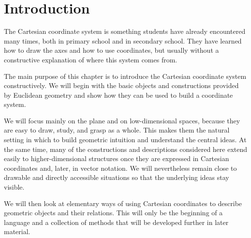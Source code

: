 \section{Introduction}

The Cartesian coordinate system is something students have already encountered many times, both in primary school and in secondary school. They have learned how to draw the axes and how to use coordinates, but usually without a constructive explanation of where this system comes from.

The main purpose of this chapter is to introduce the Cartesian coordinate system constructively. We will begin with the basic objects and constructions provided by Euclidean geometry and show how they can be used to build a coordinate system.

\begin{center}
\end{center}

We will focus mainly on the plane and on low-dimensional spaces, because they are easy to draw, study, and grasp as a whole. This makes them the natural setting in which to build geometric intuition and understand the central ideas. At the same time, many of the constructions and descriptions considered here extend easily to higher-dimensional structures once they are expressed in Cartesian coordinates and, later, in vector notation. We will nevertheless remain close to drawable and directly accessible situations so that the underlying ideas stay visible.

We will then look at elementary ways of using Cartesian coordinates to describe geometric objects and their relations. This will only be the beginning of a language and a collection of methods that will be developed further in later material.
